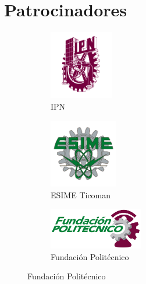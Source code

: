 \documentclass[letterpaper,12pt]{article} %
\begin{document}
    \section{Patrocinadores}
    \captionsetup[subfigure]{labelformat=empty}

    \begin{figure}[h!]
    \centering
    \begin{subfigure}[b]{0.3\textwidth}
        \centering
        \includegraphics[height=3cm]{IPN.png}
        \caption{IPN}
        \label{fig:IPN}
    \end{subfigure}
    \hfill
    \begin{subfigure}[b]{0.3\textwidth}
        \centering
        \includegraphics[height=3cm]{ESIME.png}
        \caption{ESIME Ticoman}
        \label{fig:ESIME}
    \end{subfigure}
    \hfill
    \begin{subfigure}[b]{0.3\textwidth}
        \centering
        \includegraphics[height=1.8cm]{FUNDPOL.png}
        \vspace{0.5cm}
        \caption{Fundación Politécnico}
        \label{fig:FUNDPOL}
    \end{subfigure}
    \end{figure}
\end{document}

